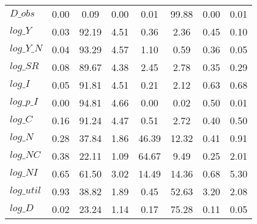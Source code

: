 \begin{center}
\begin{longtable}{lccccccc}
$D\_obs     $	 & 	        0.00	 & 	        0.09	 & 	        0.00	 & 	        0.01	 & 	       99.88	 & 	        0.00	 & 	        0.01 \\ 
$log\_Y     $	 & 	        0.03	 & 	       92.19	 & 	        4.51	 & 	        0.36	 & 	        2.36	 & 	        0.45	 & 	        0.10 \\ 
$log\_Y\_N  $	 & 	        0.04	 & 	       93.29	 & 	        4.57	 & 	        1.10	 & 	        0.59	 & 	        0.36	 & 	        0.05 \\ 
$log\_SR    $	 & 	        0.08	 & 	       89.67	 & 	        4.38	 & 	        2.45	 & 	        2.78	 & 	        0.35	 & 	        0.29 \\ 
$log\_I     $	 & 	        0.05	 & 	       91.81	 & 	        4.51	 & 	        0.21	 & 	        2.12	 & 	        0.63	 & 	        0.68 \\ 
$log\_p\_I  $	 & 	        0.00	 & 	       94.81	 & 	        4.66	 & 	        0.00	 & 	        0.02	 & 	        0.50	 & 	        0.01 \\ 
$log\_C     $	 & 	        0.16	 & 	       91.24	 & 	        4.47	 & 	        0.51	 & 	        2.72	 & 	        0.40	 & 	        0.50 \\ 
$log\_N     $	 & 	        0.28	 & 	       37.84	 & 	        1.86	 & 	       46.39	 & 	       12.32	 & 	        0.41	 & 	        0.91 \\ 
$log\_NC    $	 & 	        0.38	 & 	       22.11	 & 	        1.09	 & 	       64.67	 & 	        9.49	 & 	        0.25	 & 	        2.01 \\ 
$log\_NI    $	 & 	        0.65	 & 	       61.50	 & 	        3.02	 & 	       14.49	 & 	       14.36	 & 	        0.68	 & 	        5.30 \\ 
$log\_util  $	 & 	        0.93	 & 	       38.82	 & 	        1.89	 & 	        0.45	 & 	       52.63	 & 	        3.20	 & 	        2.08 \\ 
$log\_D     $	 & 	        0.02	 & 	       23.24	 & 	        1.14	 & 	        0.17	 & 	       75.28	 & 	        0.11	 & 	        0.05 \\ 
\end{longtable}
 \end{center}
